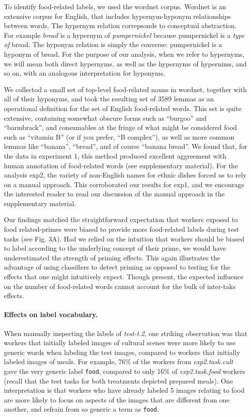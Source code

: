 \documentclass[12pt]{article}
\begin{document}
To identify food-related labels, we used the wordnet corpus.  Wordnet
is an extensive corpus for English, that includes hypernym-hyponym 
relationships between words.  The hypernym relation correpsonds to conceptual
abstraction.  For example \textit{bread} is a hypernym of 
\textit{pumpernickel} because pumpernickel is a \textit{type of} bread.
The hyponym relation is simply the converse: pumpernickel is a hyponym
of bread.  For the purpose of our analysis, when we refer to hypernyms,
we will mean both direct hypernyms, as well as the hypernyms of hypernims,
and so on, with an analogous interpretation for hyponyms.

We collectod a small set of top-level food-related nouns in wordnet,
together with all of their hyponyms, and took the resulting set of 
3589 lemmas as an operational definition for the set of English food-related 
words.  This set is quite extensive, containing somewhat obscure forms such as
``burgoo'' and ``barmbrack'', and consumables at the fringe of what might
be considered food such as ``vitamin B'' (or if you prefer, 
``B complex''), as well as more common lemmas like
``banana'',  ``bread'', and of course ``banana bread''.  We found that,
for the data in experiment 1, this method produced excellent aggreement with 
human annotation of food-related words (see supplementary material).  
For the analysis exp2, the variety of non-English names for ethnic dishes 
forced us to rely on a manual approach.  This corroborated our results
for exp1, and we encourage the interested reader to read our discussion of
the manual approach in the supplementary material.

Our findings matched the straightforward expectation that workers exposed to 
food related-primes were biased to provide more food-related labels during 
test tasks (see Fig. 3A).  Had we relied on the intuition that workers 
should be biased to label according to the underlying concept of their prime,
we would have underestimated the strength of priming effects.  This
again illustrates the advantage of using classifiers to detect priming as
opposed to testing for the effects that one might intuitively expect.  
Though present, the expected influence on the number of food-related words
cannot account for the bulk of inter-taks effects.

\paragraph{Effects on label vocabulary.}
When manually inspecting the labels of \textit{test-t.2}, one striking 
observation was that workers that initially labeled images of cultural scenes 
were more likely to use generic words when labeling the test images, compared 
to workers that initially labeled images of meals.  For example, 76\% of the 
workers from \textit{exp2.task.cult} gave the very generic label 
\texttt{food}, compared to only 16\% of \textit{exp2.task.food} workers 
(recall that the test tasks for both treatments depicted prepared meals).
One interpretation is that workers who have already labeled 5 images relating
to food are more likely to focus on aspects of the images that are different
from one another, and refrain from so generic a term as \texttt{food}.
\end{document}
